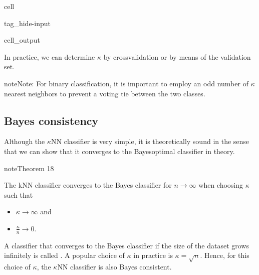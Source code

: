 \documentclass[letterpaper,10pt,english]{jupyterBook}
\begin{document}
\begin{sphinxuseclass}{cell}
\begin{sphinxuseclass}{tag_hide-input}\begin{sphinxVerbatimOutput}

\begin{sphinxuseclass}{cell_output}
\noindent{}

\end{sphinxuseclass}\end{sphinxVerbatimOutput}

\end{sphinxuseclass}
\end{sphinxuseclass}
\sphinxAtStartPar
In practice, we can determine \(\kappa\) by cross\sphinxhyphen{}validation or by means of the validation set.

\begin{sphinxadmonition}{note}{Note:}
\sphinxAtStartPar
For binary classification, it is important to employ an odd number of \( \kappa \) nearest neighbors to prevent a voting tie between the two classes.
\end{sphinxadmonition}


\subsection{Bayes consistency}
\label{\detokenize{classification_knn:bayes-consistency}}
\sphinxAtStartPar
Although the \(\kappa\)NN classifier is very simple, it is theoretically sound in the sense that we can show that it converges to the Bayes\sphinxhyphen{}optimal classifier in theory.
\label{classification_knn:theorem-1}
\begin{sphinxadmonition}{note}{Theorem 18}



\sphinxAtStartPar
The kNN classifier converges to the Bayes classifier for \(n\rightarrow \infty\) when choosing \(\kappa\) such that
\begin{itemize}
\item {} 
\sphinxAtStartPar
\(\kappa\rightarrow \infty\) and

\item {} 
\sphinxAtStartPar
\(\frac{\kappa}{n}\rightarrow 0\).

\end{itemize}
\end{sphinxadmonition}

\sphinxAtStartPar
A classifier that converges to the Bayes classifier if the size of the dataset grows infinitely is called . A popular choice of \(\kappa\) in practice is \(\kappa=\sqrt{n}\). Hence, for this choice of \(\kappa\), the \(\kappa\)NN classifier is also Bayes consistent.
\end{document}
